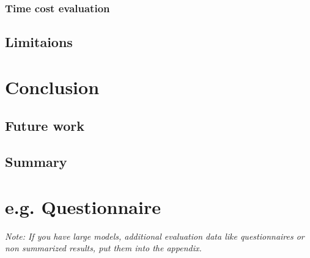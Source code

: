 \documentclass[a4paper,12pt,twoside]{report}
\begin{document}
\subsection{Time cost evaluation}

\section{Limitaions}






\chapter{Conclusion}
\section{Future work}
\section{Summary}






\appendix

\chapter{e.g. Questionnaire}

\textit{Note: If you have large models, additional evaluation data like questionnaires or non summarized results, put them into the appendix.}


\clearpage

\listoffigures
\clearpage

\listoftables
\clearpage



\end{document}
